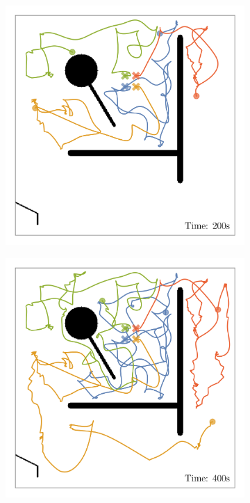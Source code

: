 \def\w{0.329\textwidth}
\begin{figure}[H]
    \centering
    \begin{subfigure}[b]{\w}
        \centering
        \includegraphics[width=\textwidth]{./figures/plots/paths/search:gradient-paths-(after-200s).png}
    \end{subfigure}
    \begin{subfigure}[b]{\w}
        \centering
        \includegraphics[width=\textwidth]{./figures/plots/paths/search:gradient-paths-(after-400s).png}

\end{subfigure}
\end{figure}
